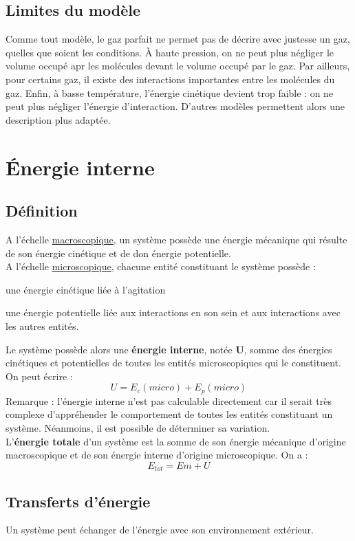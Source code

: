 \documentclass[a4paper,12pt,fleqn]{scrartcl}%
\begin{document}
	\subsection{Limites du modèle}
	Comme tout modèle, le gaz parfait ne permet pas de décrire avec justesse un gaz, quelles que soient les conditions. À haute pression, on ne peut plus négliger le volume occupé apr les molécules devant le volume occupé par le gaz. Par ailleurs, pour certains gaz, il existe des interactions importantes entre les molécules du gaz. Enfin, à basse température, l'énergie cinétique devient trop faible : on ne peut plus négliger l'énergie d'interaction. D'autres modèles permettent alors une description plus adaptée.
 
	\section{Énergie interne}
	\subsection{Définition}
	A l'échelle \underline{macroscopique}, un système possède une énergie mécanique qui résulte de son énergie cinétique et de don énergie potentielle.\\
	A l'échelle \underline{microscopique}, chacune entité constituant le système possède :
	\begin{itemize*}
		\item une énergie cinétique liée à l'agitation
		\item une énergie potentielle liée aux interactions en son sein et aux interactions avec les autres entités.
	\end{itemize*}
	Le système possède alors une \textbf{énergie interne}, notée $\mathbf{U}$, somme des énergies cinétiques et potentielles de toutes les entités microscopiques qui le constituent. On peut écrire :
	$$U = E_c(micro) + E_p(micro)$$
	Remarque : l'énergie interne n'est pas calculable directement car il serait très complexe d'appréhender le comportement de toutes les entités constituant un système. Néanmoins, il est possible de déterminer sa variation.\\
	L'\textbf{énergie totale} d'un système est la somme de son énergie mécanique d'origine macroscopique et de son énergie interne d'origine microscopique. On a :
	$$E_{tot} = Em + U$$
	
	\subsection{Transferts d'énergie}
	Un système peut échanger de l'énergie avec son environnement extérieur.
	
\end{document}

